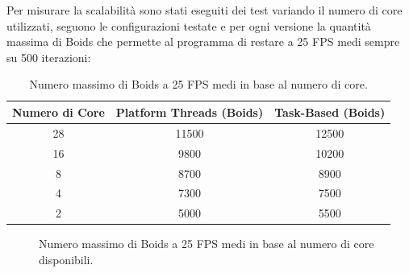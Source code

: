 \documentclass[11pt,notitlepage]{article}
\begin{document}
Per misurare la scalabilità sono stati eseguiti dei test variando il numero di core utilizzati, seguono le configurazioni testate e per ogni versione la quantità massima di Boids che permette al programma di restare a 25 FPS medi
sempre su 500 iterazioni:

\begin{table}[H]
    \centering
    \begin{tabular}{|c|c|c|}
        \hline
        \textbf{Numero di Core} & \textbf{Platform Threads (Boids)} & \textbf{Task-Based (Boids)} \\
        \hline
        28 & 11500 & 12500 \\
        \hline
        16 & 9800 & 10200 \\
        \hline
        8  & 8700 & 8900 \\
        \hline
        4  & 7300 & 7500 \\
        \hline
        2  & 5000 & 5500 \\
        \hline
    \end{tabular}
    \caption{Numero massimo di Boids a 25 FPS medi in base al numero di core.}
    \label{tab:boids-performance}
\end{table}

\begin{figure}[H]
    \centering
    \caption{Numero massimo di Boids a 25 FPS medi in base al numero di core disponibili.}
    \label{fig:scalability-graph}
\end{figure}
\end{document}
